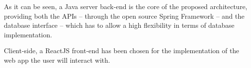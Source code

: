 \documentclass[11pt]{article}
\begin{document}
As it can be seen, a Java server back-end is the core of the proposed 
architecture, providing both the APIs -- through the open source Spring Framework
-- and the database interface -- which has to allow a high flexibility in terms 
of database implementation.

Client-side, a ReactJS front-end has been chosen for the implementation of the 
web app the user will interact with.

\end{document}
